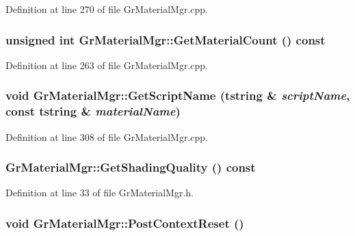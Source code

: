 Definition at line 270 of file GrMaterialMgr.cpp.\hypertarget{class_gr_material_mgr_2e5b48c6003f1d3449ba8dbff47d4fc7}{
\subsubsection[{GetMaterialCount}]{\setlength{\rightskip}{0pt plus 5cm}unsigned int GrMaterialMgr::GetMaterialCount () const}}
\label{class_gr_material_mgr_2e5b48c6003f1d3449ba8dbff47d4fc7}




Definition at line 263 of file GrMaterialMgr.cpp.\hypertarget{class_gr_material_mgr_1bdfefc758711cf3d91e5a3cff632ffc}{
\subsubsection[{GetScriptName}]{\setlength{\rightskip}{0pt plus 5cm}void GrMaterialMgr::GetScriptName ({\bf tstring} \& {\em scriptName}, \/  const {\bf tstring} \& {\em materialName})}}
\label{class_gr_material_mgr_1bdfefc758711cf3d91e5a3cff632ffc}




Definition at line 308 of file GrMaterialMgr.cpp.\hypertarget{class_gr_material_mgr_9a75c5cd132b7bffec133e4d9e8f4221}{
\subsubsection[{GetShadingQuality}]{ GrMaterialMgr::GetShadingQuality () const}}
\label{class_gr_material_mgr_9a75c5cd132b7bffec133e4d9e8f4221}




Definition at line 33 of file GrMaterialMgr.h.\hypertarget{class_gr_material_mgr_daadacddba70859d762f1d776bfcfcb1}{
\subsubsection[{PostContextReset}]{\setlength{\rightskip}{0pt plus 5cm}void GrMaterialMgr::PostContextReset ()}}
\label{class_gr_material_mgr_daadacddba70859d762f1d776bfcfcb1}




